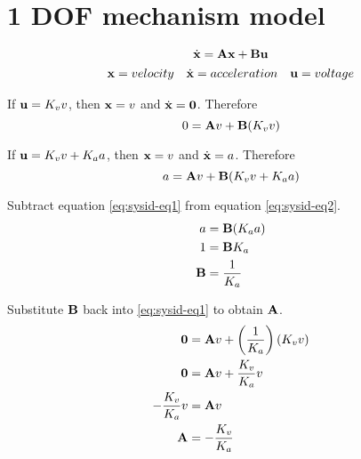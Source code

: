 \section{1 DOF mechanism model}
\begin{equation*}
  \dot{\mathbf{x}} = \mathbf{A}\mathbf{x} + \mathbf{B}\mathbf{u}
\end{equation*}
\begin{equation*}
  \begin{array}{ccc}
    \mathbf{x} = velocity & \dot{\mathbf{x}} = acceleration & \mathbf{u} = voltage
  \end{array}
\end{equation*}

If $\mathbf{u} = K_v v$, then $\mathbf{x} = v$ and $\dot{\mathbf{x}} = \mathbf{0}$.
Therefore
\begin{equation}
  0 = \mathbf{A}v + \mathbf{B}(K_v v) \label{eq:sysid-eq1}
\end{equation}

If $\mathbf{u} = K_v v + K_a a$, then $\mathbf{x} = v$ and $\dot{\mathbf{x}} = a$.
Therefore
\begin{equation}
  a = \mathbf{A}v + \mathbf{B}(K_v v + K_a a) \label{eq:sysid-eq2}
\end{equation}

Subtract equation \eqref{eq:sysid-eq1} from equation \eqref{eq:sysid-eq2}.
\begin{align*}
  a &= \mathbf{B} (K_a a) \\
  1 &= \mathbf{B} K_a \\
  \mathbf{B} &= \frac{1}{K_a}
\end{align*}

Substitute $\mathbf{B}$ back into \eqref{eq:sysid-eq1} to obtain $\mathbf{A}$.
\begin{align*}
  \mathbf{0} &= \mathbf{A}v + \left(\frac{1}{K_a}\right)(K_v v) \\
  \mathbf{0} &= \mathbf{A}v + \frac{K_v}{K_a} v \\
  -\frac{K_v}{K_a} v &= \mathbf{A}v \\
  \mathbf{A} &= -\frac{K_v}{K_a}
\end{align*}

